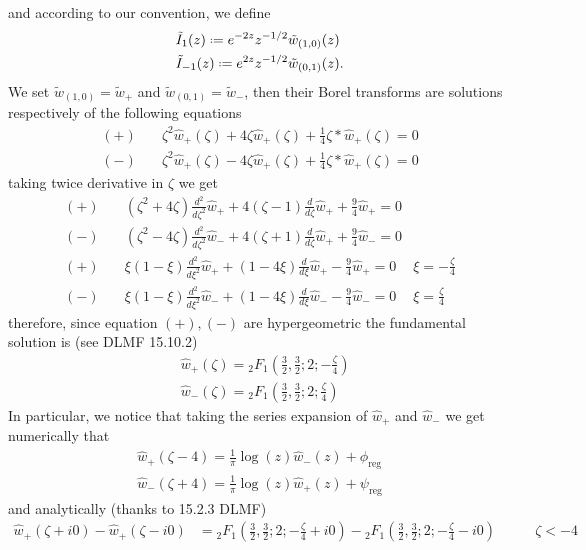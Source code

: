\documentclass[11pt,a4paper,twoside,leqno,noamsfonts]{amsart}
\numberwithin{equation}{section}
\begin{document}
\begin{example}[Bessel]
and according to our convention, we define
\begin{align}
\label{IB+} &\tilde{I}_{1}(z)\defeq e^{-2z}z^{-1/2}\tilde{w}_{(1,0)}(z)\\
\label{IB-} &\tilde{I}_{-1}(z)\defeq e^{2z}z^{-1/2}\tilde{w}_{(0,1)}(z).
\end{align}
We set $\tilde{w}_{(1,0)}=\tilde{w}_+$ and $\tilde{w}_{(0,1)}=\tilde{w}_-$, then their Borel transforms are solutions respectively of the following equations 
\begin{align*}
(+)\quad &\zeta^2\hat{w}_+(\zeta)+4\zeta\hat{w}_+(\zeta)+\frac{1}{4}\zeta\ast\hat{w}_+(\zeta)=0\\
(-)\quad &\zeta^2\hat{w}_+(\zeta)-4\zeta\hat{w}_+(\zeta)+\frac{1}{4}\zeta\ast\hat{w}_+(\zeta)=0
\end{align*}
taking twice derivative in $\zeta$ we get
\begin{align*}
(+)\quad &(\zeta^2+4\zeta)\frac{d^2}{d\zeta^2}\hat{w}_++4(\zeta-1)\frac{d}{d\zeta}\hat{w}_++\frac{9}{4}\hat{w}_+=0 &\\
(-)\quad &(\zeta^2-4\zeta)\frac{d^2}{d\zeta^2}\hat{w}_-+4(\zeta+1)\frac{d}{d\zeta}\hat{w}_++\frac{9}{4}\hat{w}_-=0 &\\
(+)\quad &\xi(1-\xi)\frac{d^2}{d\xi^2}\hat{w}_++(1-4\xi)\frac{d}{d\xi}\hat{w}_+-\frac{9}{4}\hat{w}_+=0 & \xi=-\frac{\zeta}{4} \\
(-)\quad &\xi(1-\xi)\frac{d^2}{d\xi^2}\hat{w}_-+(1-4\xi)\frac{d}{d\xi}\hat{w}_--\frac{9}{4}\hat{w}_-=0 & \xi=\frac{\zeta}{4}
\end{align*}
therefore, since equation $(+), (-)$ are hypergeometric the fundamental solution is (see DLMF 15.10.2)
\begin{align}
\label{w+}&\hat{w}_+(\zeta)={}_2F_1\left(\frac{3}{2},\frac{3}{2};2;-\frac{\zeta}{4}\right)\\
\label{w+}&\hat{w}_-(\zeta)={}_2F_1\left(\frac{3}{2},\frac{3}{2};2;\frac{\zeta}{4}\right)
\end{align}
In particular, we notice that taking the series expansion of $\hat{w}_+$ and $\hat{w}_-$ we get numerically that
\begin{align*}
\hat{w}_+(\zeta-4)=\frac{1}{\pi}\log(z)\hat{w}_-(z)+\phi_{\text{reg}}\\
\hat{w}_-(\zeta+4)=\frac{1}{\pi}\log(z)\hat{w}_+(z)+\psi_{\text{reg}}
\end{align*}
and analytically (thanks to 15.2.3 DLMF)
\begin{align*}
\hat{w}_+(\zeta+i0)-\hat{w}_+(\zeta-i0)&={}_2F_1\left(\frac{3}{2},\frac{3}{2};2;-\frac{\zeta}{4}+i0\right)-{}_2F_1\left(\frac{3}{2},\frac{3}{2};2;-\frac{\zeta}{4}-i0\right) &\qquad\zeta<-4\\

\end{align*}
\end{example}
\end{document}
